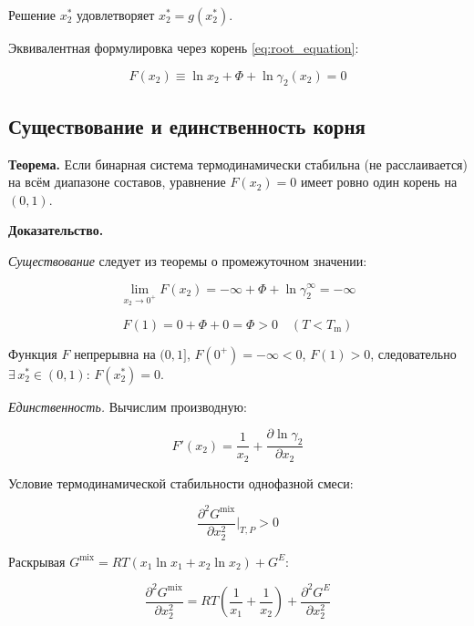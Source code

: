 \documentclass[11pt]{article}
\begin{document}
Решение $x_2^{*}$ удовлетворяет $x_2^{*} = g(x_2^{*})$.

Эквивалентная формулировка через корень \eqref{eq:root_equation}:

\begin{equation}
F(x_2) \equiv \ln x_2 + \Phi + \ln \gamma_2(x_2) = 0
\label{eq:root_equation}
\end{equation}

\subsection{Существование и единственность корня}

\textbf{Теорема.} Если бинарная система термодинамически стабильна (не расслаивается) на всём диапазоне составов, уравнение $F(x_2) = 0$ имеет ровно один корень на $(0, 1)$.

\textbf{Доказательство.}

\textit{Существование} следует из теоремы о промежуточном значении:

\begin{equation*}
\lim_{x_2 \to 0^+} F(x_2) = -\infty + \Phi + \ln \gamma_2^\infty = -\infty
\end{equation*}

\begin{equation*}
F(1) = 0 + \Phi + 0 = \Phi > 0 \quad (T < T_{\mathrm{m}})
\end{equation*}

Функция $F$ непрерывна на $(0, 1]$, $F(0^+) = -\infty < 0$, $F(1) > 0$, следовательно $\exists \, x_2^{*} \in (0, 1)$: $F(x_2^{*}) = 0$.

\textit{Единственность.} Вычислим производную:

\begin{equation*}
F'(x_2) = \frac{1}{x_2} + \frac{\partial \ln \gamma_2}{\partial x_2}
\end{equation*}

Условие термодинамической стабильности однофазной смеси:

\begin{equation*}
\frac{\partial^2 G^{\mathrm{mix}}}{\partial x_2^2}\bigg|_{T,P} > 0
\end{equation*}

Раскрывая $G^{\mathrm{mix}} = RT(x_1 \ln x_1 + x_2 \ln x_2) + G^E$:

\begin{equation*}
\frac{\partial^2 G^{\mathrm{mix}}}{\partial x_2^2} = RT\!\left(\frac{1}{x_1} + \frac{1}{x_2}\right) + \frac{\partial^2 G^E}{\partial x_2^2}
\end{equation*}
\end{document}
